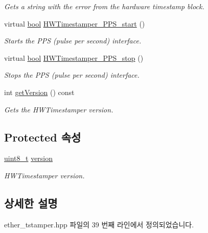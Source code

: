 \begin{DoxyCompactItemize}
\begin{DoxyCompactList}\small\item\em Gets a string with the error from the hardware timestamp block. \end{DoxyCompactList}\item 
virtual \hyperlink{avb__gptp_8h_af6a258d8f3ee5206d682d799316314b1}{bool} \hyperlink{class_common_timestamper_a2cbaeb84807ca61af0bc56bcc475468d}{H\+W\+Timestamper\+\_\+\+P\+P\+S\+\_\+start} ()
\begin{DoxyCompactList}\small\item\em Starts the P\+PS (pulse per second) interface. \end{DoxyCompactList}\item 
virtual \hyperlink{avb__gptp_8h_af6a258d8f3ee5206d682d799316314b1}{bool} \hyperlink{class_common_timestamper_ac5d9f1e5eb402dffaa8897367e9fd7d3}{H\+W\+Timestamper\+\_\+\+P\+P\+S\+\_\+stop} ()
\begin{DoxyCompactList}\small\item\em Stops the P\+PS (pulse per second) interface. \end{DoxyCompactList}\item 
int \hyperlink{class_common_timestamper_a4d1414f8d9ed8d83c91769b148106307}{get\+Version} () const 
\begin{DoxyCompactList}\small\item\em Gets the H\+W\+Timestamper version. \end{DoxyCompactList}\end{DoxyCompactItemize}
\subsection*{Protected 속성}
\begin{DoxyCompactItemize}
\item 
\hyperlink{stdint_8h_aba7bc1797add20fe3efdf37ced1182c5}{uint8\+\_\+t} \hyperlink{class_common_timestamper_ab22abc2906422da61885ac6c8e6a1a59}{version}
\begin{DoxyCompactList}\small\item\em H\+W\+Timestamper version. \end{DoxyCompactList}\end{DoxyCompactItemize}


\subsection{상세한 설명}


ether\+\_\+tstamper.\+hpp 파일의 39 번째 라인에서 정의되었습니다.



